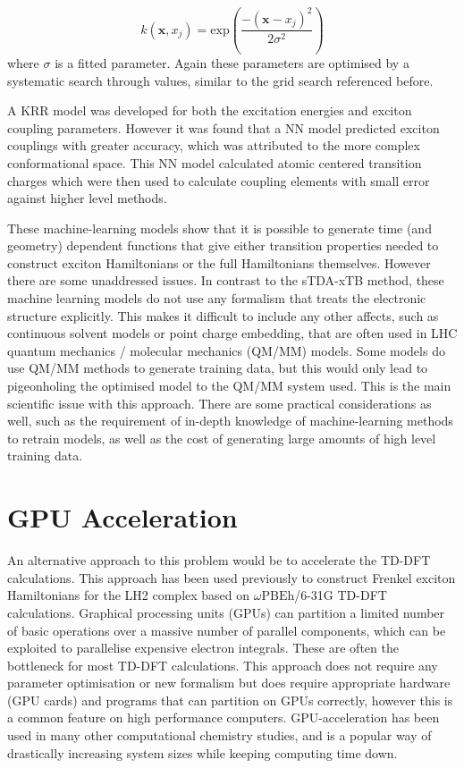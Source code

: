 \begin{equation}
	k\left(\mathbf{x}, x_j\right) = \text{exp}\left(\frac{-\left(\mathbf{x}-x_j\right)^2}{2\sigma^2}\right)
\end{equation}
%
where $\sigma$ is a fitted parameter. Again these parameters are optimised by a 
systematic search through values, similar to the grid search referenced before.

A KRR model was developed for both the excitation energies and exciton coupling 
parameters. However it was found that a NN model predicted exciton couplings with
greater accuracy, which was attributed to the more complex conformational space.
This NN model calculated atomic centered transition charges which were then used
to calculate coupling elements with small error against higher level methods.

These machine-learning models show that it is possible to generate time (and geometry)
dependent functions that give either transition properties needed to construct exciton
Hamiltonians or the full Hamiltonians themselves. However there are some unaddressed
issues. In contrast to the sTDA-xTB method, these machine learning models do not 
use any formalism that treats the electronic structure explicitly. This makes it
difficult to include any other affects, such as continuous solvent models or point
charge embedding, that are often used in LHC quantum mechanics / molecular mechanics 
(QM/MM) models. Some models do use QM/MM methods to generate training data, but 
this would only lead to pigeonholing the optimised model to the QM/MM system used.
This is the main scientific issue with this approach. There are some practical
considerations as well, such as the requirement of in-depth knowledge of machine-learning 
methods to retrain models, as well as the cost of generating large amounts of high
level training data.

\section{GPU Acceleration}
\label{sec:gpu_acceleration}

An alternative approach to this problem would be to accelerate the TD-DFT calculations.
This approach has been used previously to construct Frenkel exciton Hamiltonians
for the LH2 complex based on $\omega\text{PBEh}$/6-31G TD-DFT calculations. Graphical 
processing units (GPUs) can partition a limited number of basic operations over 
a massive number of parallel components, which can be exploited to parallelise expensive 
electron integrals. These are often the bottleneck for most TD-DFT calculations.
This approach does not require any parameter optimisation or new formalism but does
require appropriate hardware (GPU cards) and programs that can partition on GPUs
correctly, however this is a common feature on high performance computers. GPU-acceleration
has been used in many other computational chemistry studies, and is a popular way 
of drastically increasing system sizes while keeping computing time down.

